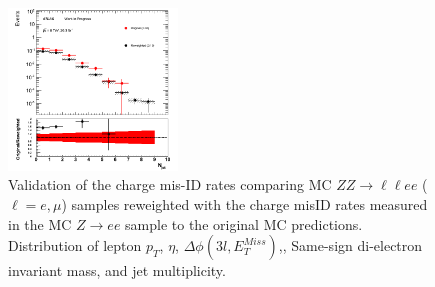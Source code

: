 \begin{figure}[htp]
 \includegraphics[width=0.4\textwidth]{figures/ChargeMisID/Validation_ChargeMisIDRates_ZZ_JetMultiplicity.png}

 \caption{Validation of the charge mis-ID rates comparing MC $ZZ\rightarrow \ell \ell ee$ ($\ell=e,\mu$) samples reweighted with the charge misID rates measured in the MC $Z\to{}ee$ 
 sample to the original MC predictions. Distribution of lepton $p_{T}$, $\eta$, $\Delta \phi(3l,E_{T}^{Miss})$,\met{}, Same-sign di-electron invariant mass, and jet multiplicity.}
 \label{fig:ChargeMisID_Validation_ZZ}
 \end{figure}






